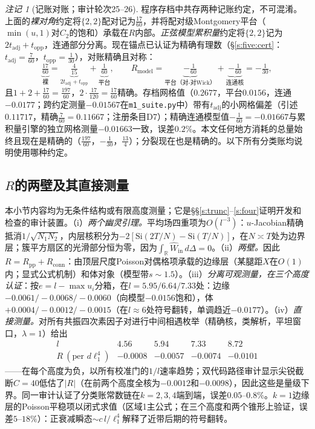 \documentclass[11pt]{article}
\numberwithin{equation}{section}
\theoremstyle{definition}
\theoremstyle{remark}
\newtheorem{remark}[theorem]{注记}
\newcommand{\Si}{\mathrm{Si}}
\begin{document}
\begin{remark}[记账对账；审计轮次25--26]\label{r:books}
程序存档中共存两种记账约定，不可混淆。上面的\emph{裸对角}约定将$\{2,2\}$配对记为$\tfrac{17}{60}$，并将配对级Montgomery平台（$\min(u,1)$对$C_2$的饱和）承载在$R$内部。\emph{正弦模型累积量}约定将$\{2,2\}$记为$2t_{\mathrm{adj}}+t_{\mathrm{opp}}$，连通部分分离。现在锚点已认证为精确有理数（\S\ref{s:five:cert}：$t_{\mathrm{adj}}=\tfrac7{60}$，$t_{\mathrm{opp}}=\tfrac1{30}$），对账精确且对称：
\[
\underbrace{\tfrac{17}{60}}_{\text{裸}}
=\underbrace{\tfrac4{15}}_{2t_{\mathrm{adj}}+t_{\mathrm{opp}}}
+\underbrace{\tfrac1{60}}_{\text{平台}},
\qquad
R_{\mathrm{model}}
=\underbrace{-\tfrac1{60}}_{\text{平台（对-对Wick）}}
+\underbrace{-\tfrac1{60}}_{\text{连通核}}
=-\tfrac1{30},
\]
且$1+2+\tfrac{17}{60}=\tfrac{197}{60}$，$2\cdot\tfrac{17}{120}=\tfrac{17}{60}$精确。存档网格值（$0.2677$，平台$0.0156$，连通$-0.0177$；跨约定测量$-0.01567$在\texttt{m1\_suite.py}中）带有$t_{\mathrm{adj}}$的小网格偏差（引述$0.11717$，精确$\tfrac7{60}=0.11667$；注册条目D7）；精确连通模型值$-\tfrac1{60}=-0.01667$与累积量引擎的独立网格测量$-0.01663$一致，误差$0.2\%$。本文任何地方消耗的总量始终且现在是精确的（$\tfrac{197}{60}$，$-\tfrac1{30}$，$\tfrac{13}4$）；分裂现在也是精确的。以下所有分类账均说明使用哪种约定。
\end{remark}

\subsection{$R$的两壁及其直接测量}\label{s:cert:walls}

本小节内容均为无条件结构或有限高度测量；它是\S\S\ref{s:trunc}--\ref{s:four}证明开发和检查的审计装置。（i）\emph{两个幽灵引理。}平均场四重项为$O(l^{-3})$：$u$-Jacobian精确抵消$1/\sqrt{N_1N_2}$，内层核积分为$-2[\Si(2T/N)-\Si(T/N)]$，在$N\asymp T$处为边界层；簇平方扇区的光滑部分恒为零，因为$\int_{\mathbb R}\widehat W_{\mathrm{in}}\,d\Delta=0$。（ii）\emph{两壁。}因此$R=R_{\mathrm{pp}}+R_{\mathrm{conn}}$：由顶层尺度Poisson对偶格项承载的边缘层（某腿距$X$在$O(1)$内；显式公式机制）和体对象（模型带$s\sim1.5$）。（iii）\emph{分离可观测量，在三个高度认证}：按$e=l-\max u_i$分箱，在$l=5.95/6.64/7.33$处：边缘$-0.0061/-0.0068/-0.0060$（向模型$-0.0156$饱和），体$+0.0004/-0.0012/-0.0015$（在$l\approx6$处符号翻转，单调趋近$-0.0177$）。（iv）\emph{直接测量。}对所有共振四次素因子对进行中间相遇枚举（精确核，类解析，平坦窗口，$\lambda=1$）给出
\[
\begin{array}{lcccc}
l & 4.56 & 5.94 & 7.33 & 8.72\\
R\ (\text{per }d\ell_1^4) & -0.0008 & -0.0057 & -0.0074 & -0.0101
\end{array}
\]
——在每个高度为负，以所有校准门的$1/l$速率趋势；双代码路径审计显示尖锐截断$C=40$低估了$|R|$（在前两个高度全核为$-0.0012$和$-0.0098$），因此这些是量级下界。同一审计认证了分类账常数链在$k=2,3,4$端到端，误差$0.05$--$0.8\%$。$k=1$边缘层的Poisson平稳项以闭式求值（区域1主公式；在三个高度和两个锥形上验证，误差$5$--$18\%$）：正衰减瞬态$\sim c\,l/\ell_1^4$解释了近带后期的符号翻转。
\end{document}
